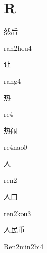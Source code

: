 ﻿%
\section*{R}

\begin{verbete}{然后}
\begin{pronuncia}{ran2hou4}
\end{pronuncia}
\end{verbete}

\begin{verbete}[rang4]{让}
\begin{pronuncia}{rang4}
\end{pronuncia}
\end{verbete}

\begin{verbete}[re4]{热}
\begin{pronuncia}{re4}
\end{pronuncia}
\end{verbete}

\begin{verbete}[re4nao0]{热闹}
\begin{pronuncia}{re4nao0}
\end{pronuncia}
\end{verbete}

\begin{verbete}[ren2]{人}
\begin{pronuncia}{ren2}
\end{pronuncia}
\end{verbete}

\begin{verbete}{人口}
\begin{pronuncia}{ren2kou3}
\end{pronuncia}
\end{verbete}

\begin{verbete}{人民币}
\begin{pronuncia}{Ren2min2bi4}
\end{pronuncia}
\end{verbete}

